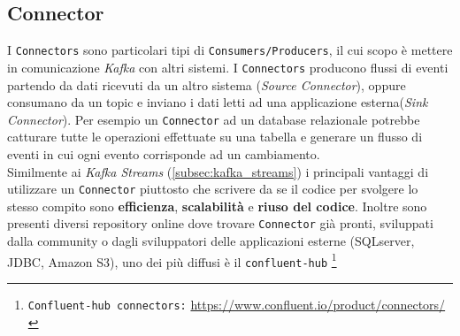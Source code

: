 \subsection{Connector}
\label{subsec:kafka_connectors}
I \texttt{Connectors} sono particolari tipi di \texttt{Consumers/Producers}, il cui scopo è mettere in comunicazione \textit{Kafka} con altri sistemi.
I \texttt{Connectors} producono flussi di eventi partendo da dati ricevuti da un altro sistema (\textit{Source Connector}), oppure consumano da un topic e inviano i dati letti ad una applicazione esterna(\textit{Sink Connector}).
Per esempio un \texttt{Connector} ad un database relazionale potrebbe catturare tutte le operazioni effettuate su una tabella e generare un flusso di eventi in cui ogni evento corrisponde ad un cambiamento.\\
Similmente ai \textit{Kafka Streams} (\ref{subsec:kafka_streams}) i principali vantaggi di utilizzare un \texttt{Connector} piuttosto che scrivere da se il codice per svolgere lo stesso compito sono
\textbf{efficienza}, \textbf{scalabilità} e \textbf{riuso del codice}.
Inoltre sono presenti diversi repository online dove trovare \texttt{Connector} già pronti, sviluppati dalla community o dagli sviluppatori delle applicazioni esterne (SQLserver, JDBC, Amazon S3),
uno dei più diffusi è il \texttt{confluent-hub} \footnote{\texttt{Confluent-hub connectors:} \url{https://www.confluent.io/product/connectors/}}

